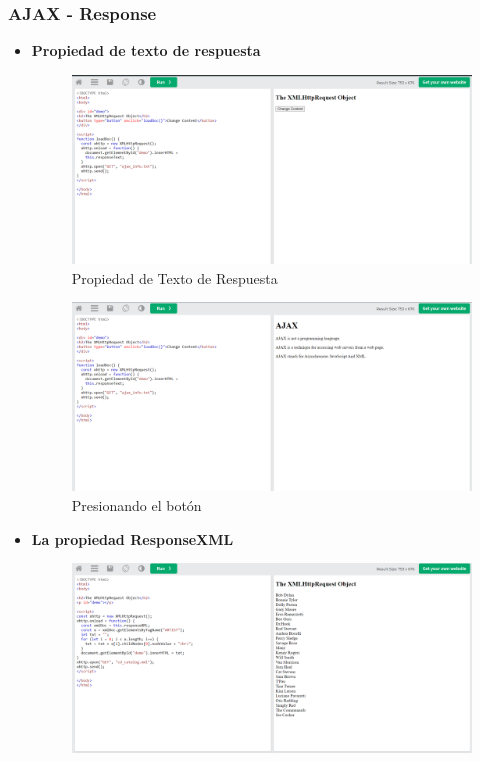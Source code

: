 \documentclass{article}
\begin{document}
	\subsubsection{AJAX - Response}
	\begin{itemize}
		\item \textbf{Propiedad de texto de respuesta}
		\begin{figure}[H]
			\centering
			\includegraphics[width=1\textwidth,keepaspectratio]{img/ejemplo10.png}
			\caption{Propiedad de Texto de Respuesta}
		\end{figure}
		\begin{figure}[H]
			\centering
			\includegraphics[width=1\textwidth,keepaspectratio]{img/boton10.png}
			\caption{Presionando el botón}
		\end{figure}
		\item \textbf{La propiedad ResponseXML}
		\begin{figure}[H]
			\centering
			\includegraphics[width=1\textwidth,keepaspectratio]{img/ejemplo11.png}

\end{figure}
\end{itemize}
\end{document}
